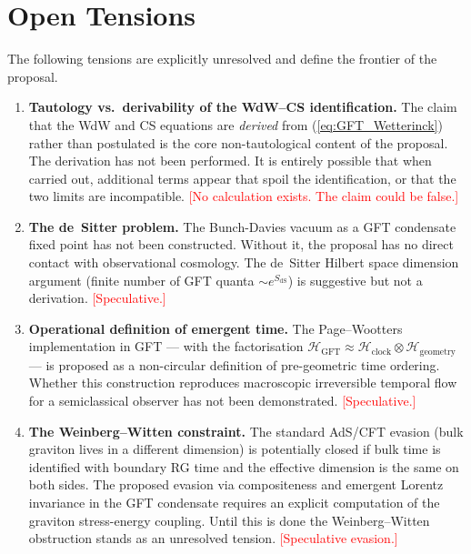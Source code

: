 \documentclass[11pt,a4paper]{article}
\begin{document}
\section{Open Tensions}
\label{sec:tensions}

The following tensions are explicitly unresolved and define the frontier of the proposal.

\begin{enumerate}

  \item \textbf{Tautology vs.\ derivability of the WdW--CS identification.}
    The claim that the WdW and CS equations are \emph{derived} from (\ref{eq:GFT_Wetterinck})
    rather than postulated is the core non-tautological content of the proposal.
    The derivation has not been performed.  It is entirely possible that when carried out,
    additional terms appear that spoil the identification, or that the two limits are
    incompatible.  \textcolor{red}{[No calculation exists.  The claim could be false.]}

  \item \textbf{The de~Sitter problem.}
    The Bunch-Davies vacuum as a GFT condensate fixed point has not been constructed.
    Without it, the proposal has no direct contact with observational cosmology.
    The de~Sitter Hilbert space dimension argument (finite number of GFT quanta
    $\sim e^{S_{\mathrm{dS}}}$) is suggestive but not a derivation.
    \textcolor{red}{[Speculative.]}

  \item \textbf{Operational definition of emergent time.}
    The Page--Wootters implementation in GFT --- with the factorisation
    $\mathcal{H}_{\mathrm{GFT}} \approx \mathcal{H}_{\mathrm{clock}}
    \otimes \mathcal{H}_{\mathrm{geometry}}$ --- is proposed as a non-circular definition
    of pre-geometric time ordering.
    Whether this construction reproduces macroscopic irreversible temporal flow for a
    semiclassical observer has not been demonstrated.
    \textcolor{red}{[Speculative.]}

  \item \textbf{The Weinberg--Witten constraint.}
    The standard AdS/CFT evasion (bulk graviton lives in a different dimension) is
    potentially closed if bulk time is identified with boundary RG time and the effective
    dimension is the same on both sides.  The proposed evasion via compositeness and
    emergent Lorentz invariance in the GFT condensate requires an explicit computation of
    the graviton stress-energy coupling.  Until this is done the Weinberg--Witten
    obstruction stands as an unresolved tension.
    \textcolor{red}{[Speculative evasion.]}


\end{enumerate}
\end{document}

